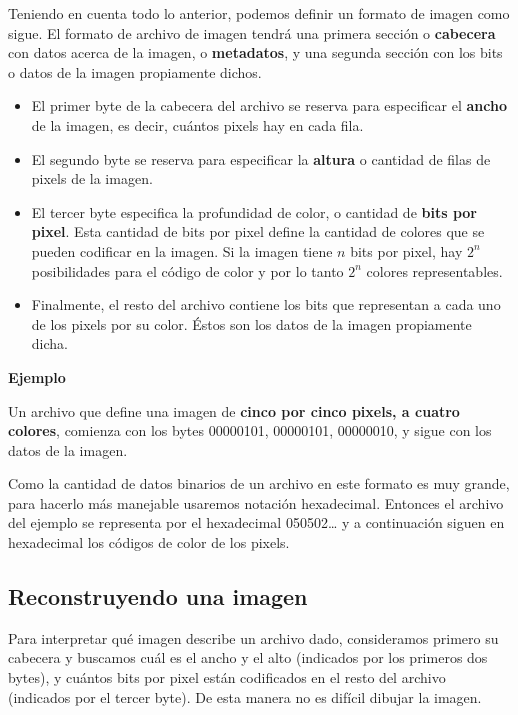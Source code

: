 \documentclass[spanish,A4,]{article}
\begin{document}
Teniendo en cuenta todo lo anterior, podemos definir un formato de
imagen como sigue. El formato de archivo de imagen tendrá una primera
sección o \textbf{cabecera} con datos acerca de la imagen, o
\textbf{metadatos}, y una segunda sección con los bits o datos de la
imagen propiamente dichos.

\begin{itemize}
\itemsep1pt\parskip0pt
\item
  El primer byte de la cabecera del archivo se reserva para especificar
  el \textbf{ancho} de la imagen, es decir, cuántos pixels hay en cada
  fila.
\item
  El segundo byte se reserva para especificar la \textbf{altura} o
  cantidad de filas de pixels de la imagen.
\item
  El tercer byte especifica la profundidad de color, o cantidad de
  \textbf{bits por pixel}. Esta cantidad de bits por pixel define la
  cantidad de colores que se pueden codificar en la imagen. Si la imagen
  tiene $n$ bits por pixel, hay $2^n$ posibilidades para el código de
  color y por lo tanto $2^n$ colores representables.
\item
  Finalmente, el resto del archivo contiene los bits que representan a
  cada uno de los pixels por su color. Éstos son los datos de la imagen
  propiamente dicha.
\end{itemize}

\textbf{Ejemplo}

Un archivo que define una imagen de \textbf{cinco por cinco pixels, a
cuatro colores}, comienza con los bytes 00000101, 00000101, 00000010, y
sigue con los datos de la imagen.

Como la cantidad de datos binarios de un archivo en este formato es muy
grande, para hacerlo más manejable usaremos notación hexadecimal.
Entonces el archivo del ejemplo se representa por el hexadecimal
050502\ldots{} y a continuación siguen en hexadecimal los códigos de
color de los pixels.

\subsection{Reconstruyendo una imagen}\label{reconstruyendo-una-imagen}

Para interpretar qué imagen describe un archivo dado, consideramos
primero su cabecera y buscamos cuál es el ancho y el alto (indicados por
los primeros dos bytes), y cuántos bits por pixel están codificados en
el resto del archivo (indicados por el tercer byte). De esta manera no
es difícil dibujar la imagen.
\end{document}
